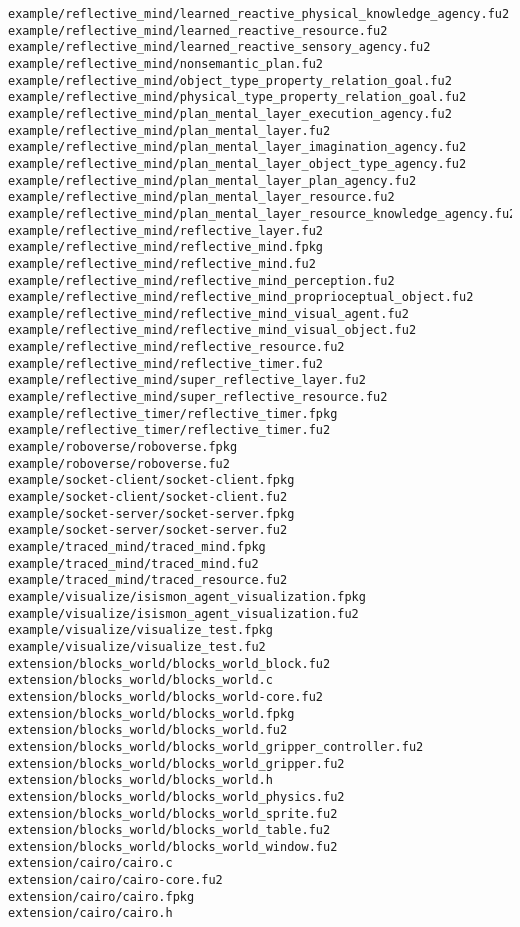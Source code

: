 \begin{lstlisting}
example/reflective_mind/learned_reactive_physical_knowledge_agency.fu2
example/reflective_mind/learned_reactive_resource.fu2
example/reflective_mind/learned_reactive_sensory_agency.fu2
example/reflective_mind/nonsemantic_plan.fu2
example/reflective_mind/object_type_property_relation_goal.fu2
example/reflective_mind/physical_type_property_relation_goal.fu2
example/reflective_mind/plan_mental_layer_execution_agency.fu2
example/reflective_mind/plan_mental_layer.fu2
example/reflective_mind/plan_mental_layer_imagination_agency.fu2
example/reflective_mind/plan_mental_layer_object_type_agency.fu2
example/reflective_mind/plan_mental_layer_plan_agency.fu2
example/reflective_mind/plan_mental_layer_resource.fu2
example/reflective_mind/plan_mental_layer_resource_knowledge_agency.fu2
example/reflective_mind/reflective_layer.fu2
example/reflective_mind/reflective_mind.fpkg
example/reflective_mind/reflective_mind.fu2
example/reflective_mind/reflective_mind_perception.fu2
example/reflective_mind/reflective_mind_proprioceptual_object.fu2
example/reflective_mind/reflective_mind_visual_agent.fu2
example/reflective_mind/reflective_mind_visual_object.fu2
example/reflective_mind/reflective_resource.fu2
example/reflective_mind/reflective_timer.fu2
example/reflective_mind/super_reflective_layer.fu2
example/reflective_mind/super_reflective_resource.fu2
example/reflective_timer/reflective_timer.fpkg
example/reflective_timer/reflective_timer.fu2
example/roboverse/roboverse.fpkg
example/roboverse/roboverse.fu2
example/socket-client/socket-client.fpkg
example/socket-client/socket-client.fu2
example/socket-server/socket-server.fpkg
example/socket-server/socket-server.fu2
example/traced_mind/traced_mind.fpkg
example/traced_mind/traced_mind.fu2
example/traced_mind/traced_resource.fu2
example/visualize/isismon_agent_visualization.fpkg
example/visualize/isismon_agent_visualization.fu2
example/visualize/visualize_test.fpkg
example/visualize/visualize_test.fu2
extension/blocks_world/blocks_world_block.fu2
extension/blocks_world/blocks_world.c
extension/blocks_world/blocks_world-core.fu2
extension/blocks_world/blocks_world.fpkg
extension/blocks_world/blocks_world.fu2
extension/blocks_world/blocks_world_gripper_controller.fu2
extension/blocks_world/blocks_world_gripper.fu2
extension/blocks_world/blocks_world.h
extension/blocks_world/blocks_world_physics.fu2
extension/blocks_world/blocks_world_sprite.fu2
extension/blocks_world/blocks_world_table.fu2
extension/blocks_world/blocks_world_window.fu2
extension/cairo/cairo.c
extension/cairo/cairo-core.fu2
extension/cairo/cairo.fpkg
extension/cairo/cairo.h

\end{lstlisting}
